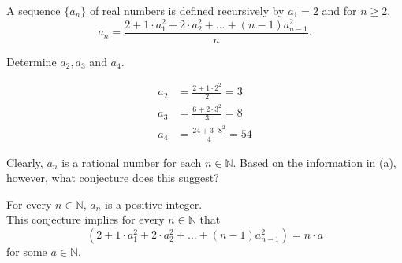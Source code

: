\documentclass[12pt]{article}
\newcommand{\N}{\mathbb{N}}
\newenvironment{problem}[2][Problem]{\begin{trivlist}
		\item[\hskip \labelsep {\bfseries #1}\hskip \labelsep {\bfseries #2.}]}{\end{trivlist}}
\newenvironment{solution}[2][Solution]{\begin{trivlist}
		\item[\hskip \labelsep {\bfseries #1}\hskip \labelsep {\bfseries #2.}]}{\end{trivlist}}
\begin{document}
	\begin{problem}{3}
		A sequence $\{a_{n}\}$ of real numbers is defined recursively by $a_{1} = 2$ and for $n\geq 2$,
		\begin{equation*}
			a_{n} = \frac{2+1\cdot a_{1}^{2} + 2\cdot a_{2}^{2} + \ldots + (n-1)a_{n-1}^{2}}{n}.
		\end{equation*}
		\begin{enumerate}[label = (\alph*)]
			\item Determine $a_{2}, a_{3}$ and $a_{4}$.
			\begin{solution}{a}
				\begin{align*}
					a_{2} &= \frac{2+1\cdot2^{2}}{2} = 3\\
					a_{3} &= \frac{6+2\cdot 3^{2}}{3} = 8\\
					a_{4} &= \frac{24+3\cdot 8^{2}}{4} = 54
				\end{align*}
			\end{solution}
			\item Clearly, $a_{n}$ is a rational number for each $n\in \N$. Based on the information in (a), however, what conjecture does this suggest?
			\begin{solution}{b}
				For every $n\in \N$, $a_{n}$ is a positive integer.\\
				 This conjecture implies for every $n\in \N$ that 
				\begin{equation*}  
					 \left(2+1\cdot a_{1}^{2} + 2\cdot a_{2}^{2} + \ldots + (n-1)a_{n-1}^{2}\right) = n\cdot a
				\end{equation*}
				 for some $a\in \N$.
			\end{solution}
		\end{enumerate}
	\end{problem}
	
\end{document}
